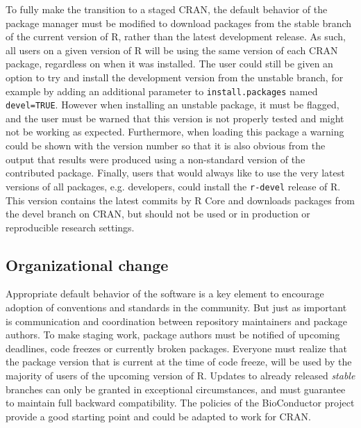 To fully make the transition to a staged CRAN, the default behavior of the
package manager must be modified to download packages from the stable branch of
the current version of R, rather than the latest development release. As such,
all users on a given version of R will be using the same version of each CRAN
package, regardless on when it was installed. The user could still be given an
option to try and install the development version from the unstable branch, for
example by adding an additional parameter to \texttt{install.packages} named
\texttt{devel=TRUE}. However when installing an unstable package, it must be
flagged, and the user must be warned that this version is not properly tested
and might not be working as expected. Furthermore, when loading this package a
warning could be shown with the version number so that it is also obvious from
the output that results were produced using a non-standard version of the
contributed package. Finally, users that would always like to use the very
latest versions of all packages, e.g. developers, could install the
\texttt{r-devel} release of R. This version contains the latest commits by R
Core and downloads packages from the devel branch on CRAN, but should not be
used or in production or reproducible research settings.

\subsection{Organizational change}

Appropriate default behavior of the software is a key element to encourage
adoption of conventions and standards in the community. But just as important is
communication and coordination between repository maintainers and package authors.
To make staging work, package authors must be notified of upcoming deadlines,
code freezes or currently broken packages. Everyone must realize that the
package version that is current at the time of code freeze, will be used by the
majority of users of the upcoming version of R. Updates to already released
\emph{stable} branches can only be granted in exceptional circumstances, and
must guarantee to maintain full backward compatibility. The policies of the
BioConductor project provide a good starting point and could be adapted to work
for CRAN.

